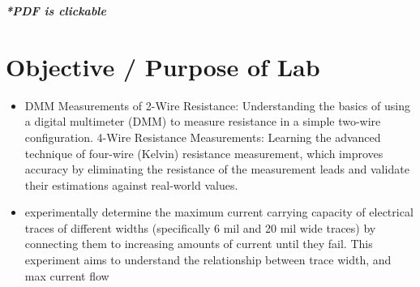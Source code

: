 \documentclass[a4paper,11pt]{article}%
\begin{document}


\pagebreak

\tableofcontents
\listoffigures
\listoftables
\vfill
\begin{center}
	\textbf{\textit{*PDF is clickable}}
\end{center}

\pagebreak

\section{Objective / Purpose of Lab}

\begin{itemize}
	\item DMM Measurements of 2-Wire Resistance: Understanding the basics of using a digital multimeter (DMM) to measure resistance in a simple two-wire configuration.
	4-Wire Resistance Measurements: Learning the advanced technique of four-wire (Kelvin) resistance measurement, which improves accuracy by eliminating the resistance of the measurement leads and validate their estimations against real-world values.
	\item experimentally determine the maximum current carrying capacity of electrical traces of different widths (specifically 6 mil and 20 mil wide traces) by connecting them to increasing amounts of current until they fail. This experiment aims to understand the relationship between trace width, and max current flow\\
	

\end{itemize}
\end{document}
